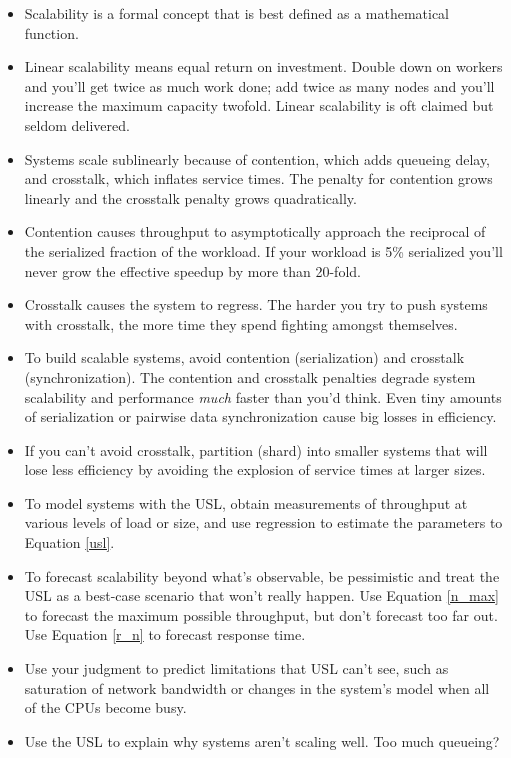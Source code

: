 \documentclass{vivid_layout}
\begin{document}
\begin{itemize}
\item Scalability is a formal concept that is best defined as a mathematical
function.
\item Linear scalability means equal return on investment. Double down on
workers and you'll get twice as much work done; add twice as many nodes and
you'll increase the maximum capacity twofold. Linear scalability is oft claimed
but seldom delivered.
\item Systems scale sublinearly because of contention, which adds queueing
delay, and crosstalk, which inflates service times. The penalty for contention
grows linearly and the crosstalk penalty grows quadratically.
\item Contention causes throughput to asymptotically approach the
reciprocal of the serialized fraction of the workload. If your workload is 5\%
serialized you'll never grow the effective speedup by more than 20-fold.
\item Crosstalk causes the system to regress. The harder you try to push systems
with crosstalk, the more time they spend fighting amongst themselves.
\item To build scalable systems, avoid contention (serialization) and crosstalk
(synchronization).
The contention and crosstalk penalties degrade system scalability and
performance {\itshape much} faster than you'd think. Even tiny amounts of
serialization or pairwise data synchronization cause big losses in efficiency.
\item If you can't avoid crosstalk, partition (shard) into smaller systems that will
lose less efficiency by avoiding the explosion of service times at larger sizes.
\item To model systems with the USL, obtain measurements of throughput at
various levels of load or size, and use regression to estimate the parameters to
Equation \ref{usl}.
\item To forecast scalability beyond what's observable, be pessimistic and treat
the USL as a best-case scenario that won't really happen. Use Equation
\ref{n_max} to forecast the maximum possible throughput, but don't forecast too
far out. Use Equation \ref{r_n} to forecast response time.
\item Use your judgment to predict limitations that USL can't see, such as
saturation of network bandwidth or changes in the system's model when all of the
CPUs become busy.
\item Use the USL to explain why systems aren't scaling well. Too much queueing?

\end{itemize}
\end{document}
